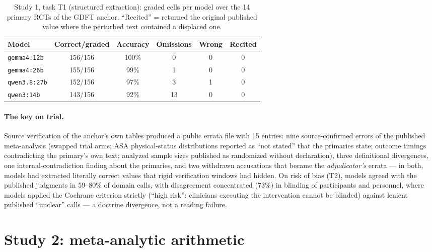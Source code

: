 \documentclass[11pt]{article}
\begin{document}
\begin{table}[t]
\centering\small
\caption{Study 1, task T1 (structured extraction): graded cells per model over the 14 primary RCTs of the GDFT anchor. ``Recited'' = returned the original published value where the perturbed text contained a displaced one.}
\label{tab:study1}
\begin{tabular}{lccccc}
\toprule
Model & Correct/graded & Accuracy & Omissions & Wrong & Recited \\
\midrule
\texttt{gemma4:12b}  & 156/156 & 100\% & 0  & 0 & 0 \\
\texttt{gemma4:26b}  & 155/156 & 99\%  & 1  & 0 & 0 \\
\texttt{qwen3.8:27b} & 152/156 & 97\%  & 3  & 1 & 0 \\
\texttt{qwen3:14b}   & 143/156 & 92\%  & 13 & 0 & 0 \\
\bottomrule
\end{tabular}
\end{table}

\paragraph{The key on trial.} Source verification of the anchor's own tables produced a public errata file with 15 entries: nine source-confirmed errors of the published meta-analysis (swapped trial arms; ASA physical-status distributions reported as ``not stated'' that the primaries state; outcome timings contradicting the primary's own text; analyzed sample sizes published as randomized without declaration), three definitional divergences, one internal-contradiction finding about the primaries, and two withdrawn accusations that became the \emph{adjudicator's} errata --- in both, models had extracted literally correct values that rigid verification windows had hidden. On risk of bias (T2), models agreed with the published judgments in 59--80\% of domain calls, with disagreement concentrated (73\%) in blinding of participants and personnel, where models applied the Cochrane criterion strictly (``high risk'': clinicians executing the intervention cannot be blinded) against lenient published ``unclear'' calls --- a doctrine divergence, not a reading failure.

\section{Study 2: meta-analytic arithmetic}
\end{document}
